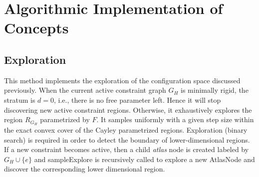 \section{Algorithmic Implementation of Concepts}
\subsection{Exploration}
This method implements the exploration of the configuration space
discussed previously. When the current active constraint graph $G_H$
is minimally rigid, the stratum is $d=0$, i.e., there is no free parameter
left. Hence it will stop discovering new active constraint regions.
Otherwise, it exhaustively explores the region $R_{G_H}$ parametrized by $F$.
It samples uniformly with a given step size within the exact convex cover of the
Cayley parametrized regions. Exploration (binary search) is required in order
to detect the boundary of lower-dimensional regions. If a new constraint
becomes active, then a child \textit{atlas} node is created labeled
by $G_H \cup \{e\}$ and sampleExplore is recursively called to explore a new
AtlasNode and discover the corresponding lower dimensional region.\\


